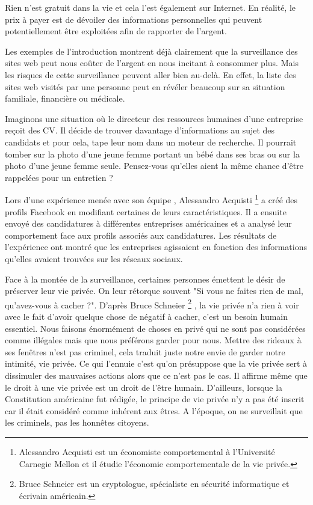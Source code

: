 Rien n'est gratuit dans la vie et cela l'est également sur Internet. En réalité, le prix à payer est de dévoiler des informations personnelles qui peuvent potentiellement être exploitées afin de rapporter de l'argent.
\newline

Les exemples de l'introduction montrent déjà clairement que la surveillance des sites web peut nous coûter de l'argent en nous incitant à consommer plus. Mais les risques de cette surveillance peuvent aller bien au-delà. En effet, la liste des sites web visités par une personne peut en révéler beaucoup sur sa situation familiale, financière ou médicale.
\newline

Imaginons une situation où le directeur des ressources humaines d'une entreprise reçoit des CV. Il décide de trouver davantage d'informations au sujet des candidats et pour cela, tape leur nom dans un moteur de recherche. Il pourrait tomber sur la photo d'une jeune femme portant un bébé dans ses bras ou sur la photo d'une jeune femme seule. Pensez-vous qu'elles aient la même chance d'être rappelées pour un entretien ?
\newline

Lors d'une expérience menée avec son équipe \cite{TED_Alessandro_Acquisti}, Alessandro Acquisti \footnote{Alessandro Acquisti est un économiste comportemental à l'Université Carnegie Mellon et il étudie l'économie comportementale de la vie privée.} a créé des profils Facebook en modifiant certaines de leurs caractéristiques. Il a ensuite envoyé des candidatures à différentes entreprises américaines et a analysé leur comportement face aux profils associés aux candidatures. Les résultats de l'expérience ont montré que les entreprises agissaient en fonction des informations qu'elles avaient trouvées sur les réseaux sociaux.
\newline

Face à la montée de la surveillance, certaines personnes émettent le désir de préserver leur vie privée. On leur rétorque souvent "Si vous ne faites rien de mal, qu'avez-vous à cacher ?".
D'après Bruce Schneier \footnote{Bruce Schneier est un cryptologue, spécialiste en sécurité informatique et écrivain américain.} \cite{the_eternal_value_of_privacy}, la vie privée n'a rien à voir avec le fait d'avoir quelque chose de négatif à cacher, c'est un besoin humain essentiel.
Nous faisons énormément de choses en privé qui ne sont pas considérées comme illégales mais que nous préférons garder pour nous. Mettre des rideaux à ses fenêtres n'est pas criminel, cela traduit juste notre envie de garder notre intimité, vie privée.
Ce qui l'ennuie c'est qu'on présuppose que la vie privée sert à dissimuler des mauvaises actions alors que ce n'est pas le cas. Il affirme même que le droit à une vie privée est un droit de l'être humain. D'ailleurs, lorsque la Constitution américaine fut rédigée, le principe de vie privée n'y a pas été inscrit car il était considéré comme inhérent aux êtres. A l'époque, on ne surveillait que les criminels, pas les honnêtes citoyens.

